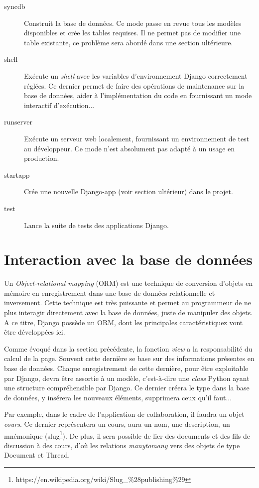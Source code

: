\documentclass[a4paper,12pt]{article}
\begin{document}
\begin{description}
\item[syncdb] Construit la base de données. Ce mode passe en revue tous les modèles
              disponibles et crée les tables requises. Il ne permet pas de modifier
              une table existante, ce problème sera abordé dans une section ultérieure.
\item[shell] Exécute un \textit{shell} avec les variables d'environnement Django
             correctement réglées. Ce dernier permet de faire des opérations de maintenance
             sur la base de données, aider à l'implémentation du code en fournissant
             un mode interactif d'exécution...
\item[runserver] Exécute un serveur web localement, fournissant un environnement
             de test au développeur. Ce mode n'est absolument pas adapté à un usage en production.
\item[startapp] Crée une nouvelle Django-app (voir section ultérieur) dans le projet.
\item[test] Lance la suite de tests des applications Django.
\end{description}


\section{Interaction avec la base de données}

Un \textit{Object-relational mapping} (ORM) est une technique
de conversion d'objets en mémoire en enregistrement dans une base de données
relationnelle et inversement. Cette technique est très puissante et permet
au programmeur de ne plus interagir directement avec la base de données, juste
de manipuler des objets. A ce titre, Django possède un ORM, dont les principales
caractéristiquez vont être développées ici.

Comme évoqué dans la section précédente, la fonction \textit{view} a la responsabilité
du calcul de la page. Souvent cette dernière se base sur des informations présentes
en base de données. Chaque enregistrement de cette dernière, pour être exploitable
par Django, devra être assortie à un modèle, c'est-à-dire une \textit{class} Python
ayant une structure compréhensible par Django. Ce dernier créera le type dans la
base de données, y insérera les nouveaux éléments, supprimera ceux qu'il faut...

Par exemple, dans le cadre de l'application de collaboration, il faudra un objet
\textit{cours}. Ce dernier représentera un cours, aura un nom, une description,
un mnémonique (slug\footnote{https://en.wikipedia.org/wiki/Slug\_\%28publishing\%29}).
De plus, il sera possible de lier des documents et des fils de discussion à des
cours, d'où les relations \textit{manytomany} vers des objets de type Document
et Thread.
\end{document}
